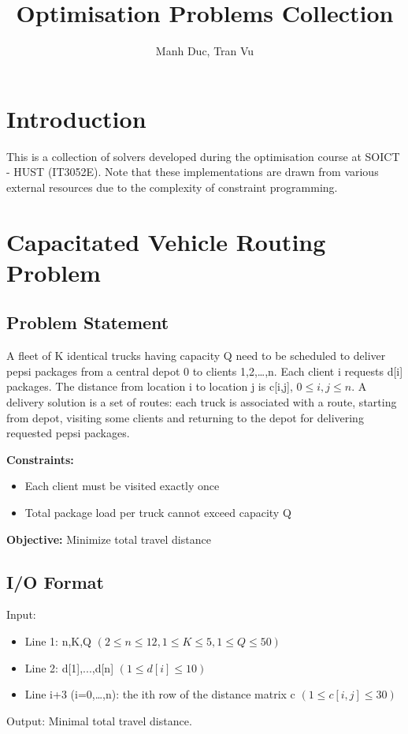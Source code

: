 \documentclass{article}
\newcommand{\subtitle}[1]{%
  \posttitle{%
    \par\end{center}
    \begin{center}\large#1\end{center}}%
}
\begin{document}
\title{Optimisation Problems Collection}
\subtitle{SOICT - HUST (IT3052E)}
\author{Manh Duc, Tran Vu}
\date{}
\maketitle
\pagebreak
\tableofcontents
\pagebreak
\section{Introduction}
This is a collection of solvers developed during the optimisation course at SOICT - HUST (IT3052E). Note that these implementations are drawn from various external resources due to the complexity of constraint programming.

\section{Capacitated Vehicle Routing Problem}

\subsection{Problem Statement}
A fleet of K identical trucks having capacity Q need to be scheduled to deliver pepsi packages from a central depot 0 to clients 1,2,…,n. Each client i requests d[i] packages. The distance from location i to location j is c[i,j], $0 \leq i,j \leq n$. A delivery solution is a set of routes: each truck is associated with a route, starting from depot, visiting some clients and returning to the depot for delivering requested pepsi packages.

\textbf{Constraints:}

\begin{itemize}
    \item Each client must be visited exactly once
    \item Total package load per truck cannot exceed capacity Q
\end{itemize}

\textbf{Objective:} Minimize total travel distance

\subsection{I/O Format}
Input:
\begin{itemize}
    \item Line 1: n,K,Q $(2\le n\le 12,1\le K\le 5,1\le Q\le50)$
    \item Line 2: d[1],...,d[n] $(1\le d[i]\le 10)$
    \item Line i+3 (i=0,…,n): the ith row of the distance matrix c $(1\le c[i,j]\le 30)$
\end{itemize}
Output: Minimal total travel distance.
\end{document}
